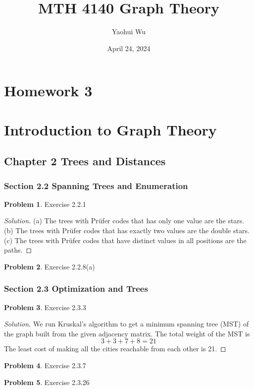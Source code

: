 \documentclass[12pt]{article}
\title{MTH 4140 Graph Theory}
\author{Yaohui Wu}
\date{April 24, 2024}
\theoremstyle{definition}
\newtheorem{problem}{Problem}
\newenvironment*{solution}{\begin{proof}[Solution]}{\end{proof}}
\begin{document}
\maketitle
\section*{Homework 3}
\section*{Introduction to Graph Theory}

\subsection*{Chapter 2 Trees and Distances}
\subsubsection*{Section 2.2 Spanning Trees and Enumeration}
\begin{problem}
    Exercise 2.2.1
\end{problem}
\begin{solution}
    (a) The trees with Prüfer codes that has only one value are the stars. (b)
    The trees with Prüfer codes that has exactly two values are the double
    stars. (c) The trees with Prüfer codes that have distinct values in all
    positions are the paths.
\end{solution}
\begin{problem}
    Exercise 2.2.8(a)
\end{problem}

\subsubsection*{Section 2.3 Optimization and Trees}
\begin{problem}
    Exercise 2.3.3
\end{problem}
\begin{solution}
    We run Kruskal's algorithm to get a minimum spanning tree (MST) of the
    graph built from the given adjacency matrix. The total weight of the MST
    is \[3+3+7+8=21\] The least cost of making all the cities reachable from
    each other is 21.
\end{solution}
\begin{problem}
    Exercise 2.3.7
\end{problem}
\begin{problem}
    Exercise 2.3.26
\end{problem}
\end{document}
